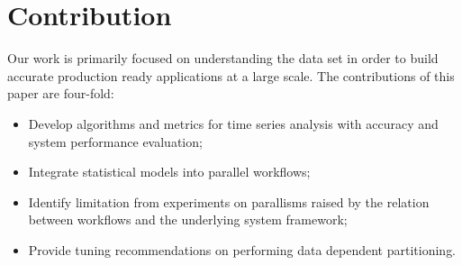 \section{Contribution}

Our work is primarily focused on understanding the data set in order to build accurate production ready applications at a large scale.  The contributions of this paper are four-fold: 

\begin{itemize}
	\item Develop algorithms and metrics for time series analysis with accuracy and system performance evaluation;	
	\item Integrate statistical models into parallel workflows; 
	\item Identify limitation from experiments on parallisms raised by the relation between workflows and the underlying system framework; 
	\item Provide tuning recommendations on performing data dependent partitioning.
\end{itemize}
